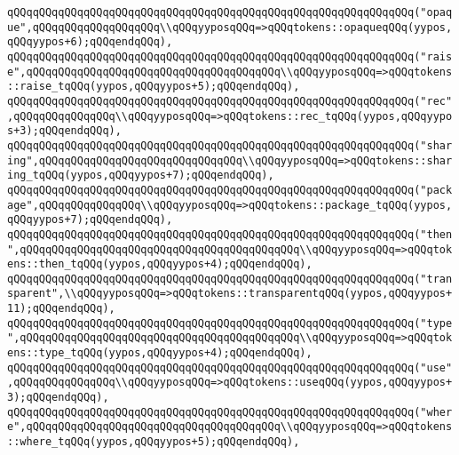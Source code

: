 \verb|qQQqqQQqqQQqqQQqqQQqqQQqqQQqqQQqqQQqqQQqqQQqqQQqqQQqqQQqqQQqqQQq("opaque",qQQqqQQqqQQqqQQqqQQq\\qQQqyyposqQQq=>qQQqtokens::opaqueqQQq(yypos,qQQqyypos+6);qQQqendqQQq),|\newline
\verb|qQQqqQQqqQQqqQQqqQQqqQQqqQQqqQQqqQQqqQQqqQQqqQQqqQQqqQQqqQQqqQQq("raise",qQQqqQQqqQQqqQQqqQQqqQQqqQQqqQQqqQQqqQQq\\qQQqyyposqQQq=>qQQqtokens::raise_tqQQq(yypos,qQQqyypos+5);qQQqendqQQq),|\newline
\verb|qQQqqQQqqQQqqQQqqQQqqQQqqQQqqQQqqQQqqQQqqQQqqQQqqQQqqQQqqQQqqQQq("rec",qQQqqQQqqQQqqQQq\\qQQqyyposqQQq=>qQQqtokens::rec_tqQQq(yypos,qQQqyypos+3);qQQqendqQQq),|\newline
\verb|qQQqqQQqqQQqqQQqqQQqqQQqqQQqqQQqqQQqqQQqqQQqqQQqqQQqqQQqqQQqqQQq("sharing",qQQqqQQqqQQqqQQqqQQqqQQqqQQqqQQq\\qQQqyyposqQQq=>qQQqtokens::sharing_tqQQq(yypos,qQQqyypos+7);qQQqendqQQq),|\newline
\verb|qQQqqQQqqQQqqQQqqQQqqQQqqQQqqQQqqQQqqQQqqQQqqQQqqQQqqQQqqQQqqQQq("package",qQQqqQQqqQQqqQQq\\qQQqyyposqQQq=>qQQqtokens::package_tqQQq(yypos,qQQqyypos+7);qQQqendqQQq),|\newline
\verb|qQQqqQQqqQQqqQQqqQQqqQQqqQQqqQQqqQQqqQQqqQQqqQQqqQQqqQQqqQQqqQQq("then",qQQqqQQqqQQqqQQqqQQqqQQqqQQqqQQqqQQqqQQqqQQq\\qQQqyyposqQQq=>qQQqtokens::then_tqQQq(yypos,qQQqyypos+4);qQQqendqQQq),|\newline
\verb|qQQqqQQqqQQqqQQqqQQqqQQqqQQqqQQqqQQqqQQqqQQqqQQqqQQqqQQqqQQqqQQq("transparent",\\qQQqyyposqQQq=>qQQqtokens::transparentqQQq(yypos,qQQqyypos+11);qQQqendqQQq),|\newline
\verb|qQQqqQQqqQQqqQQqqQQqqQQqqQQqqQQqqQQqqQQqqQQqqQQqqQQqqQQqqQQqqQQq("type",qQQqqQQqqQQqqQQqqQQqqQQqqQQqqQQqqQQqqQQqqQQq\\qQQqyyposqQQq=>qQQqtokens::type_tqQQq(yypos,qQQqyypos+4);qQQqendqQQq),|\newline
\verb|qQQqqQQqqQQqqQQqqQQqqQQqqQQqqQQqqQQqqQQqqQQqqQQqqQQqqQQqqQQqqQQq("use",qQQqqQQqqQQqqQQq\\qQQqyyposqQQq=>qQQqtokens::useqQQq(yypos,qQQqyypos+3);qQQqendqQQq),|\newline
\verb|qQQqqQQqqQQqqQQqqQQqqQQqqQQqqQQqqQQqqQQqqQQqqQQqqQQqqQQqqQQqqQQq("where",qQQqqQQqqQQqqQQqqQQqqQQqqQQqqQQqqQQqqQQq\\qQQqyyposqQQq=>qQQqtokens::where_tqQQq(yypos,qQQqyypos+5);qQQqendqQQq),|\newline
